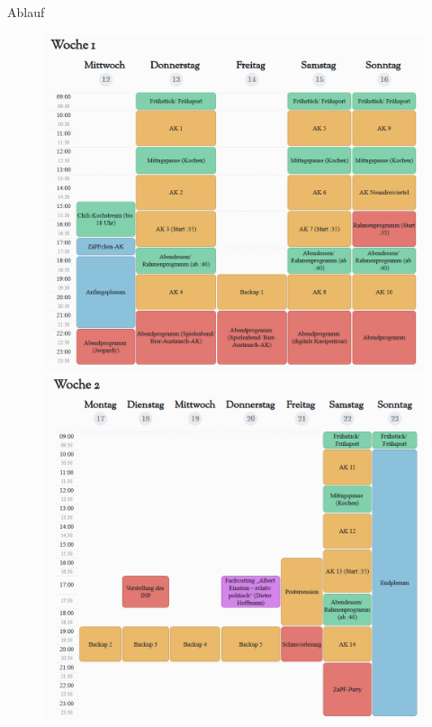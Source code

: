\documentclass[compress,]{beamer}
\begin{document}
\begin{frame}{Ablauf}

%

\begin{figure}
   \begin{minipage}[b]{.45\linewidth} %
      \includegraphics[width=\linewidth]{OstseePlan1.png}
      
   \end{minipage}
   \hspace{.05\linewidth}%
   \begin{minipage}[b]{.45\linewidth} %
      \includegraphics[width=\linewidth]{OstseePlan2.png}
      

\end{minipage}
\end{figure}
\end{frame}
\end{document}
